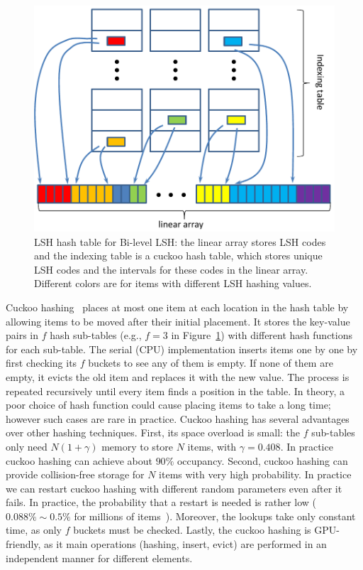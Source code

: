 \begin{figure}[!htb]
  \centering
  \includegraphics[width=0.8\linewidth]{figs/6/hashtable.pdf}
  \caption[LSH hash table for Bi-level LSH]{\label{fig:6:hashtable} LSH hash table for Bi-level LSH: the linear array stores LSH codes and the indexing table is a cuckoo hash table, which stores unique LSH codes and the intervals for these codes in the linear array. Different colors are for items with different LSH hashing values.}
\end{figure}

Cuckoo hashing~\cite{Pagh:2004:CH} places at most one item at each location in the hash table by allowing items to be moved after their initial placement. It stores the key-value pairs in $f$ hash sub-tables (e.g., $f = 3$ in Figure~\ref{fig:6:hashtable}) with different hash functions for each sub-table. The serial (CPU) implementation inserts items one by one by first checking its $f$ buckets to see any of them is empty. If none of them are empty, it evicts the old item and replaces it with the new value. The process is repeated recursively until every item finds a position in the table. In theory, a poor choice of hash function could cause placing items to take a long time; however such cases are rare in practice.
Cuckoo hashing has several advantages over other hashing techniques. First, its space overload is small: the $f$ sub-tables only need $N(1+\gamma)$ memory to store $N$ items, with $\gamma = 0.408$. In practice cuckoo hashing can achieve about $90\%$ occupancy. Second, cuckoo hashing can provide collision-free storage for $N$ items with very high probability. In practice we can restart cuckoo hashing with different random parameters even after it fails. In practice, the probability that a restart is needed is rather low ($0.088\%\sim0.5\%$ for millions of items~\cite{Alcantara:2009:RPH}). Moreover, the lookups take only constant time, as only $f$ buckets must be checked. Lastly, the cuckoo hashing is GPU-friendly, as it main operations (hashing, insert, evict) are performed in an independent manner for different elements.

